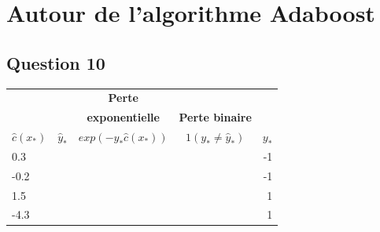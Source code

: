 \documentclass[]{article}
\begin{document}
\hypertarget{autour-de-lalgorithme-adaboost}{%
\section{Autour de l'algorithme
Adaboost}\label{autour-de-lalgorithme-adaboost}}

\hypertarget{question-10}{%
\subsection{Question 10}\label{question-10}}

\begin{tabular}{|l|c|c|c|r|} \hline & &  \textbf{Perte}  & &  \\ & & \textbf{exponentielle} & \textbf{Perte binaire} & \\ $\hat{c}(x_*)$ & $\hat{y}_*$ & $exp(-y_* \hat{c}(x_*))$ &   $1(y_* \neq \hat{y}_*)$ & $y_*$ \tabularnewline \hline 0.3 & & & & -1 \tabularnewline \hline -0.2 & & & & -1 \tabularnewline \hline 1.5 & & & & 1 \tabularnewline \hline -4.3 & & & & 1 \tabularnewline \hline \end{tabular}
\end{document}
